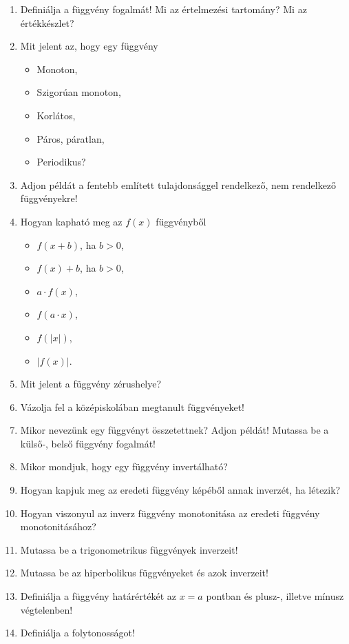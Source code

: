 \vfill
\begin{questions}[section.5.4]
  \begin{enumerate}
    \item Definiálja a függvény fogalmát! Mi az értelmezési tartomány? Mi az
          értékkészlet?
    \item Mit jelent az, hogy egy függvény
          \begin{itemize}
            \item Monoton,
            \item Szigorúan monoton,
            \item Korlátos,
            \item Páros, páratlan,
            \item Periodikus?
          \end{itemize}
    \item Adjon példát a fentebb említett tulajdonsággel rendelkező, nem
          rendelkező függvényekre!
    \item Hogyan kapható meg az $f(x)$ függvényből
          \begin{itemize}
            \item $f(x+b)$, ha $b>0$,
            \item $f(x)+b$, ha $b>0$,
            \item $a \cdot f(x)$,
            \item $f(a \cdot x)$,
            \item $f(|x|)$,
            \item $|f(x)|$.
          \end{itemize}
    \item Mit jelent a függvény zérushelye?
    \item Vázolja fel a középiskolában megtanult függvényeket!
    \item Mikor nevezünk egy függvényt összetettnek? Adjon példát! Mutassa be a
          külső-, belső függvény fogalmát!
    \item Mikor mondjuk, hogy egy függvény invertálható?
    \item Hogyan kapjuk meg az eredeti függvény képéből annak inverzét, ha
          létezik?
    \item Hogyan viszonyul az inverz függvény monotonitása az eredeti függvény
          monotonitásához?
    \item Mutassa be a trigonometrikus függvények inverzeit!
    \item Mutassa be az hiperbolikus függvényeket és azok inverzeit!
    \item Definiálja a függvény határértékét az $x = a$ pontban és plusz-,
          illetve mínusz végtelenben!
    \item Definiálja a folytonosságot!
  \end{enumerate}
\end{questions}